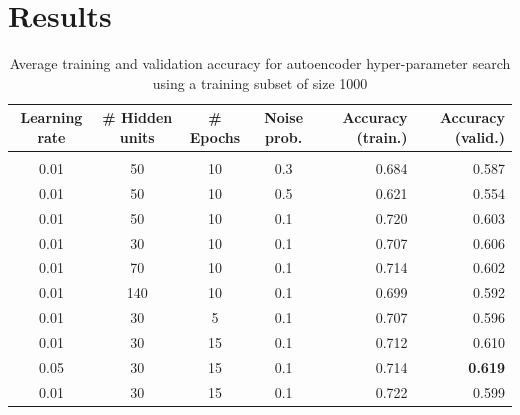 \documentclass{article} %
\begin{document}
\section{Results}
\begin{table}[h]
\caption{Average training and validation accuracy for autoencoder hyper-parameter
 search using a training subset of size 1000}
\label{results-table}
\begin{center}
\begin{adjustbox}{width=1\textwidth}
\begin{tabular}{cccc|rr}

\multicolumn{1}{c}{\bf Learning rate}  
&\multicolumn{1}{c}{\bf \# Hidden units}  
&\multicolumn{1}{c}{\bf \# Epochs} 
&\multicolumn{1}{c}{\bf Noise prob.} 
&\multicolumn{1}{|r}{\bf Accuracy (train.)}
&\multicolumn{1}{r}{\bf Accuracy (valid.)}
\\ \hline \\	
0.01 & 50 & 10 & 0.3 & 0.684 & 0.587 \\
0.01 & 50 & 10 & 0.5 & 0.621 & 0.554 \\
0.01 & 50 & 10 & 0.1 & 0.720 & 0.603 \\
0.01 & 30 & 10 & 0.1 & 0.707 & 0.606 \\
0.01 & 70 & 10 & 0.1 & 0.714 & 0.602 \\
0.01 & 140 & 10 & 0.1 & 0.699 & 0.592 \\
0.01 & 30 & 5 & 0.1 & 0.707 & 0.596 \\
0.01 & 30 & 15 & 0.1 & 0.712 & 0.610 \\
0.05 & 30 & 15 & 0.1 & 0.714 & \textbf{0.619} \\
0.01 & 30 & 15 & 0.1 & 0.722 & 0.599 \\

\end{tabular}
\end{adjustbox}
\end{center}
\end{table}
\end{document}
